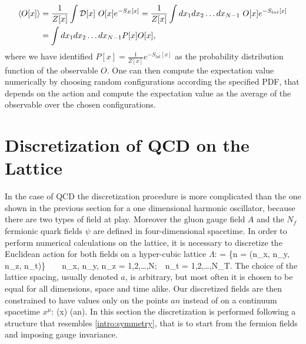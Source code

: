 \begin{align}
    \langle O[x] \rangle &=  \frac{1}{Z[x]} \int \mathcal{D}[x] ~O[x] e^{-S_{E}[x]} = \frac{1}{Z[x]} \int dx_1 dx_2\dots dx_{N-1}~O[x]e^{-S_{lat}[x]}  \\\nonumber
    &=\int dx_1 dx_2\dots dx_{N-1} P[x] O[x],
\end{align}
where we have identified $P[x] = \frac{1}{Z[x]}e^{-S_{lat}[x]}$ as the probability distribution function of the observable $O$. One can then compute the expectation value numerically by choosing random configurations according the specified PDF, that depends on the action and compute the expectation value as the average of the observable over the chosen configurations.


\section{Discretization of QCD on the Lattice}
\label{sec:lattice_discretize}
In the case of QCD the discretization procedure is more complicated than the one shown in the previous section for a one dimensional harmonic oscillator, because there are two types of field at play. Moreover the gluon gauge field $A$ and the $N_f$ fermionic quark fields $\psi$ are defined in four-dimensional spacetime. In order to perform numerical calculations on the lattice, it is necessary to discretize the Euclidean action for both fields on a hyper-cubic lattice $\Lambda$:
\beq
    \Lambda = \{n = (n_x, n_y, n_z, n_t)\}~~~~n_x, n_y, n_z = 1,2,\dots,N;~~n_t = 1,2,\dots,N_T.
\eeq
The choice of the lattice spacing, usually denoted $a$, is arbitrary, but most often it is chosen to be equal for all dimensions, space and time alike. Our discretized fields are then constrained to have values only on the points $an$ instead of on a continuum spacetime $x^\mu$:
\beq
    \phi(x)  \phi(an).
\eeq
In this section the discretization is performed following a structure that resembles \cref{intro:symmetry}, that is to start from the fermion fields and imposing gauge invariance.

